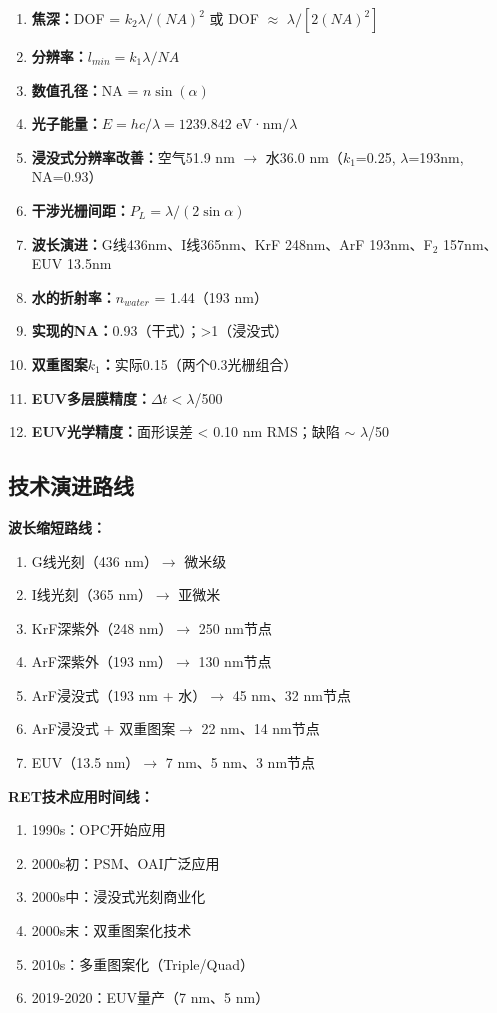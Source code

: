 \documentclass[UTF8,12pt,a4paper]{ctexart}
\begin{document}
\begin{enumerate}
    \item \textbf{焦深：}DOF = $k_2\lambda/(NA)^2$ 或 DOF $\approx$ $\lambda/[2(NA)^2]$
    \item \textbf{分辨率：}$l_{min} = k_1\lambda/NA$
    \item \textbf{数值孔径：}NA = $n\sin(\alpha)$
    \item \textbf{光子能量：}$E = hc/\lambda = 1239.842$ eV·nm$/\lambda$
    \item \textbf{浸没式分辨率改善：}空气51.9 nm $\rightarrow$ 水36.0 nm（$k_1$=0.25, $\lambda$=193nm, NA=0.93）
    \item \textbf{干涉光栅间距：}$P_L = \lambda/(2\sin\alpha)$
    \item \textbf{波长演进：}G线436nm、I线365nm、KrF 248nm、ArF 193nm、F$_2$ 157nm、EUV 13.5nm
    \item \textbf{水的折射率：}$n_{water}$ = 1.44（193 nm）
    \item \textbf{实现的NA：}0.93（干式）；>1（浸没式）
    \item \textbf{双重图案$k_1$：}实际0.15（两个0.3光栅组合）
    \item \textbf{EUV多层膜精度：}$\Delta t < \lambda$/500
    \item \textbf{EUV光学精度：}面形误差 < 0.10 nm RMS；缺陷 $\sim$ $\lambda$/50
\end{enumerate}

\subsection{技术演进路线}

\textbf{波长缩短路线：}
\begin{enumerate}
    \item G线光刻（436 nm）$\rightarrow$ 微米级
    \item I线光刻（365 nm）$\rightarrow$ 亚微米
    \item KrF深紫外（248 nm）$\rightarrow$ 250 nm节点
    \item ArF深紫外（193 nm）$\rightarrow$ 130 nm节点
    \item ArF浸没式（193 nm + 水）$\rightarrow$ 45 nm、32 nm节点
    \item ArF浸没式 + 双重图案$\rightarrow$ 22 nm、14 nm节点
    \item EUV（13.5 nm）$\rightarrow$ 7 nm、5 nm、3 nm节点
\end{enumerate}

\textbf{RET技术应用时间线：}
\begin{enumerate}
    \item 1990s：OPC开始应用
    \item 2000s初：PSM、OAI广泛应用
    \item 2000s中：浸没式光刻商业化
    \item 2000s末：双重图案化技术
    \item 2010s：多重图案化（Triple/Quad）
    \item 2019-2020：EUV量产（7 nm、5 nm）
\end{enumerate}
\end{document}
